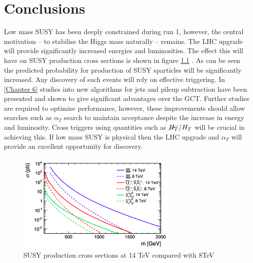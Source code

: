 
\chapter{Conclusions} %

\label{Chapter7} %



Low mass SUSY has been deeply constrained during run 1, however, the central motivation -- to stabilise the Higgs mass naturally -- remains. The LHC upgrade will provide significantly increased energies and luminosities. The effect this will have on SUSY production cross sections is shown in figure \ref{snow} \cite{ProjectedCx}. As can be seen the predicted probability for production of SUSY sparticles will be significantly increased. Any discovery of such events will rely on effective triggering. In \ref{Chapter 6} studies into new algorithms for jets and pileup subtraction have been presented and shown to give significant advantages over the GCT. Further studies are required to optimise performance, however, these improvements should allow searches such as $\alpha_T$ search to maintain acceptance despite the increase in energy and luminosity. Cross triggers using quantities such as $\cancel{H_T}/{H_T}$ will be crucial in achieving this. If low mass SUSY is physical then the LHC upgrade and $\alpha_T$ will provide an excellent opportunity for discovery. 
\begin{figure}
\centering
    \includegraphics[width=0.7\textwidth]{Figures/snowmass.png}
  \caption{SUSY production cross sections at 14 TeV compared with 8TeV}
  \label{snow}
\end{figure}


